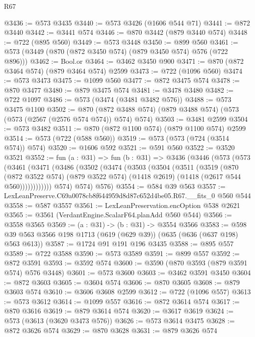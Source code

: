 \begin{lexlean}{R67}
\begin{coremodule}
@3436 := @573 @3435
@3440 := @573 @3426 (@1606 @544 @71)
@3441 := @872 @3440
@3442 := @3441 @574
@3446 := @870 @3442 (@879 @3440 @574)
@3448 := @722 (@895 @560)
@3449 := @573 @3448
@3450 := @899 @560
@3461 := @573 (@3449 (@870 (@872 @3450 @574) (@879 @3450 @574) @576 (@722 @896)))
@3462 := Bool.or
@3464 := @3462 @3450 @900
@3471 := @870 (@872 @3464 @574) (@879 @3464 @574) @2599
@3473 := @722 (@1096 @560)
@3474 := @573 @3473
@3475 := @1099 @560
@3477 := @872 @3475 @574
@3478 := @870 @3477
@3480 := @879 @3475 @574
@3481 := @3478 @3480
@3482 := @722 @1097
@3486 := @573 (@3474 (@3481 @3482 @576))
@3488 := @573 @3475 @1100
@3502 := @870 (@872 @3488 @574) (@879 @3488 @574) (@573 (@573 (@2567 (@2576 @574 @574)) @574) @574)
@3503 := @3481 @2599
@3504 := @573 @3482
@3511 := @870 (@872 @1100 @574) (@879 @1100 @574) @2599
@3514 := @573 (@722 (@588 @560))
@3519 := @573 (@573 (@724 (@3514 @574)) @574)
@3520 := @1606 @592
@3521 := @591 @560
@3522 := @3520 @3521
@3552 := fun (a : @31) =>
  fun (b : @31) =>
  @3436
    (@3446
      (@573
        (@573
          (@3461
            (@3471
              (@3486
                (@3502
                  (@3474
                    (@3503
                      (@3504
                        (@3511
                          (@3519
                            (@870
                              (@872 @3522 @574)
                              (@879 @3522 @574)
                              (@1418 @2619)
                              (@1418 (@2617 @544 @560))))))))))))
          @574)
        @574)
      @576)
@3554 := @584 @39 @563
@3557 := LexLeanPreserve.C69a0078cb8f644959d8d87c652d4be05.R67.__fits_0 @560 @544
@3558 := @587 @3557
@3561 := LexLeanPreservation.encOption @538 @2621
@3565 := @3561 (VerdantEngine.ScalarF64.planAdd @560 @544)
@3566 := @3558 @3565
@3569 := (a : @31) -> (b : @31) -> @3554 @3566
@3583 := @598 @39 @563 @3566 @198 @1713 (@619 (@629 @39)) (@635 (@636 (@637 @198) @563 @613))
@3587 := @1724 @91 @191 @196 @3435
@3588 := @895 @557
@3589 := @722 @3588
@3590 := @573 @3589
@3591 := @899 @557
@3592 := @872 @3591
@3593 := @3592 @574
@3600 := @3590 (@870 @3593 (@879 @3591 @574) @576 @3448)
@3601 := @573 @3600
@3603 := @3462 @3591 @3450
@3604 := @872 @3603
@3605 := @3604 @574
@3606 := @870 @3605
@3608 := @879 @3603 @574
@3610 := @3606 @3608 @2599
@3612 := @722 (@1096 @557)
@3613 := @573 @3612
@3614 := @1099 @557
@3616 := @872 @3614 @574
@3617 := @870 @3616
@3619 := @879 @3614 @574
@3620 := @3617 @3619
@3624 := @573 (@3613 (@3620 @3473 @576))
@3626 := @573 @3614 @3475
@3628 := @872 @3626 @574
@3629 := @870 @3628
@3631 := @879 @3626 @574

\end{coremodule}
\end{lexlean}
